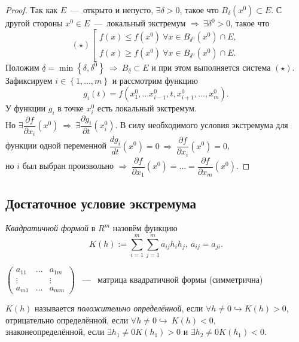 \begin{proof}
    Так как $E$~---~открыто и непусто, $\exists \delta > 0$, такое что $B_\delta(x^0) \subset E$. С другой стороны $x^0 \in E$~---~локальный экстремум $\Longrightarrow \ \exists \delta^0 > 0$, такое что 
    $$(\star)
        \left[
        \begin{array}{l}
        f(x) \le f(x^0) \ \forall x \in B_{\delta^0}(x^0) \cap E, \\
        f(x) \ge f(x^0) \ \forall x \in B_{\delta^0}(x^0) \cap E.
        \end{array}
        \right.
    $$
    Положим $\underline{\delta} = \min \left\{ \delta, \delta^0 \right\} \ \Longrightarrow \ B_{\underline{\delta}} \subset E$ и при этом выполняется система $(\star)$. \\
    Зафиксируем $i \in \left\{1, \dots, m \right\} $ и рассмотрим функцию 
    $$g_i(t) = f\left(x_1^0, \dots x_{i - 1}^0, t, x_{i + 1}^0, \dots, x_m^0 \right).$$
    У функции $g_i$ в точке $x_i^0$ есть локальный экстремум. \\
    Но $\exists \dfrac{\partial f}{\partial x_i}(x^0)\ \Longrightarrow \ \exists \dfrac{\partial g_i}{\partial t} (x_i^0)$.
    В силу необходимого условия экстремума для функции одной переменной $\dfrac{d g_i}{d t} (x^0) = 0 \ \Longrightarrow \ \dfrac{\partial f}{\partial x_i} (x^0) = 0$, \\
    но $i$ был выбран произвольно $\Longrightarrow \ \dfrac{\partial f}{\partial x_1}(x^0) = \dots = \dfrac{\partial f}{\partial x_m}(x^0)$.
\end{proof}

\subsection{Достаточное условие экстремума}
\begin{definition}
    \textit{Квадратичной формой} в $R^m$ назовём функцию $$K(h) := \sum\limits_{i=1}^m \sum\limits_{j=1}^m a_{ij} h_i h_j, \ a_{ij} = a_{ji}.$$
\end{definition}

$\begin{pmatrix}
  a_{11} & \dots & a_{1m} \\
 \vdots & & \vdots \\
  a_{m1} & \dots & a_{mm}
\end{pmatrix} $
~---~ матрица квадратичной формы (симметрична)
\begin{definition}
    $K(h)$ называется \textit{положительно определённой}, если $\forall h \neq 0 \hookrightarrow K(h) > 0$, \\
    отрицательно определённой, если $\forall h \neq 0 \hookrightarrow\ K(h) < 0$, \\
    знаконеопределённой, если $\exists h_1 \neq 0 K(h_1) > 0$ и $\exists h_2 \neq 0 K(h_1) < 0$.
\end{definition}

